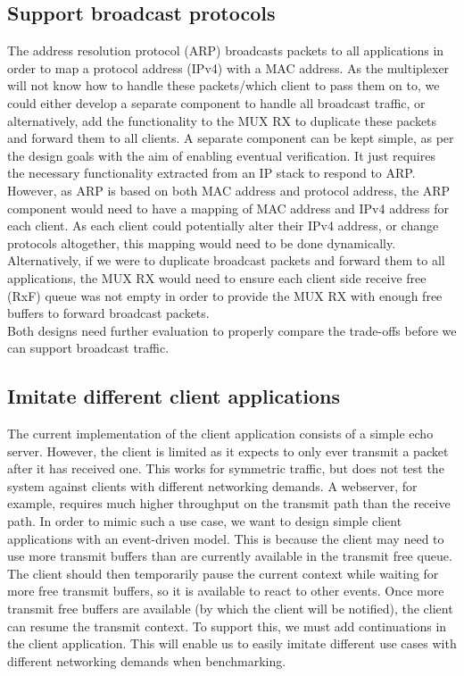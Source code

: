 \subsection{Support broadcast protocols}\label{s:arp}
The address resolution protocol (ARP) broadcasts packets to all applications in order to map a protocol
address (IPv4) with a MAC address. As the multiplexer will not know how to handle these packets/which client
to pass them on to, we could either develop a separate component to handle all broadcast traffic, or
alternatively, add the functionality to the MUX RX to duplicate these packets and forward them to all clients.
A separate component can be kept simple, as per the design goals with the aim of enabling eventual verification. It just
requires the necessary functionality extracted from an IP stack to respond to ARP. However, as ARP is based on both 
MAC address and protocol address, the ARP component would need to have a mapping of MAC address and
IPv4 address for each client. As each client could potentially alter
their IPv4 address, or change protocols altogether, this mapping would need to be done dynamically.\\ 
Alternatively, if we were to duplicate broadcast packets and forward them to all applications, the MUX RX would need to ensure
each client side receive free (RxF) queue was not empty in order to provide the MUX RX with enough free buffers to forward broadcast
packets. \\
Both designs need further evaluation to properly compare the trade-offs before we can support broadcast traffic.

\subsection{Imitate different client applications}\label{s:client}
The current implementation of the client application consists of a simple echo server. However, the client 
is limited as it expects to only ever transmit a packet after it has received one. This works for symmetric 
traffic, but does not test the system against clients with different networking demands. A webserver, for example, 
requires much higher throughput on the transmit path than the receive path. In order to mimic such a use case,
we want to design simple client applications with an event-driven model. This is because the client may need to
use more transmit buffers than are currently available in the transmit free queue. The client should then temporarily 
pause the current context while waiting for more free transmit buffers, so it is available to react to other events. 
Once more transmit free buffers are available (by which the client will be notified), the client can resume the transmit context. 
To support this, we must add continuations in the client application. This will enable us to easily imitate
different use cases with different networking demands when benchmarking.

